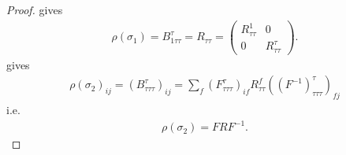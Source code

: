 \documentclass[a4paper,10pt,oneside]{book}
\makeatletter
\theoremstyle{plain}
\theoremstyle{definition}
\theoremstyle{remark}
\newcommand{\centermath}[1]{\centerline{\begin{minipage}{\linewidth}#1\end{minipage}}}
\newcounter{mycounter}
\newcommand{\fs}[3][]{
  \begin{tikzpicture}[scale=0.3,font=\footnotesize,anchor=mid,baseline={([yshift=-.5ex]current bounding box.center)}]
    \def\height{1.5}
    \def\offset{0.5}
    \ifthenelse{\equal{#1}{}}{\def\height{1}}{} %
    \setcounter{mycounter}{0}
    \@for\el:=#2\do{
      \ifthenelse{\equal{#1}{\value{mycounter}}}{
        \braid at (\value{mycounter},\height) s_1^{-1};
        \stepcounter{mycounter}
      }{
        \stepcounter{mycounter}
        \ifthenelse{\equal{#1}{\value{mycounter}}}{
        }{
          \draw (\value{mycounter}, \height) to (\value{mycounter}, 0);
        }
      }
      \node at (\value{mycounter}, \height+\offset) {$\el$};
    }
    \draw (0, 0) to (\value{mycounter}+1, 0);
    \setcounter{mycounter}{0}
    \@for\el:=#3\do{
      \node at (\value{mycounter}+0.5, -0.6) {$\el$};
      \stepcounter{mycounter}
    }
  \end{tikzpicture}
}
\makeatother
\begin{document}
{\begin{proof}
   gives
  \begin{align*}
    \rho(\sigma_1) = B_{1\tau\tau}^{\tau} = R_{\tau\tau} =
    \begin{pmatrix}
      R_{\tau\tau}^1 & 0 \\
      0 & R_{\tau\tau}^\tau
    \end{pmatrix}.
  \end{align*}
   gives
  \begin{align*}
    \rho(\sigma_2)_{ij} = \left( B^\tau_{\tau\tau\tau} \right)_{ij} = \sum_f \left( F_{\tau\tau\tau}^\tau \right)_{if} R_{\tau\tau}^f \left( \left( F^{-1} \right)_{\tau\tau\tau}^\tau \right)_{fj}
  \end{align*}
  i.e.
  \begin{align*}
    \rho(\sigma_2) = F R F^{-1}.
  \end{align*}

\end{proof}}
\end{document}
